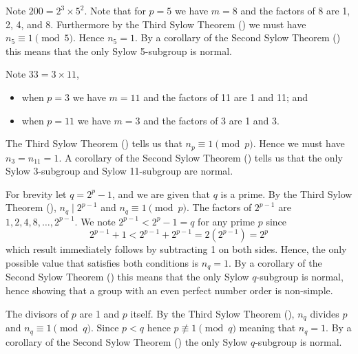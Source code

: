 \begin{questions}
    \item Note $200 = 2^3 \times 5^2$. Note that for $p = 5$ we have $m = 8$ and the factors of 8 are 1, 2, 4, and 8. Furthermore by the Third Sylow Theorem () we must have $n_5 \equiv 1 \pmod 5$. Hence $n_5 = 1$. By a corollary of the Second Sylow Theorem () this means that the only Sylow 5-subgroup is normal.

    \item Note $33 = 3 \times 11$,
    \begin{itemize}
        \item when $p = 3$ we have $m = 11$ and the factors of 11 are 1 and 11; and
        \item when $p = 11$ we have $m = 3$ and the factors of 3 are 1 and 3.
    \end{itemize}
    The Third Sylow Theorem () tells us that $n_p \equiv 1 \pmod p$. Hence we must have $n_3 = n_{11} = 1$. A corollary of the Second Sylow Theorem () tells us that the only Sylow 3-subgroup and Sylow 11-subgroup are normal.

    \item For brevity let $q = 2^p - 1$, and we are given that $q$ is a prime. By the Third Sylow Theorem (), $n_q \mid 2^{p-1}$ and $n_q \equiv 1 \pmod p$. The factors of $2^{p-1}$ are $1, 2, 4, 8, \dots, 2^{p-1}$. We note $2^{p-1} < 2^p - 1 = q$ for any prime $p$ since
    \[
        2^{p-1} + 1 < 2^{p-1} + 2^{p-1} = 2(2^{p-1}) = 2^p
    \]
    which result immediately follows by subtracting 1 on both sides. Hence, the only possible value that satisfies both conditions is $n_q = 1$. By a corollary of the Second Sylow Theorem () this means that the only Sylow $q$-subgroup is normal, hence showing that a group with an even perfect number order is non-simple.

    \item \begin{partquestions}{\roman*}
        \item The divisors of $p$ are 1 and $p$ itself. By the Third Sylow Theorem (), $n_q$ divides $p$ and $n_q \equiv 1 \pmod q$. Since $p < q$ hence $p \not\equiv 1 \pmod q$ meaning that $n_q = 1$. By a corollary of the Second Sylow Theorem () the only Sylow $q$-subgroup is normal.


\end{partquestions}
\end{questions}
